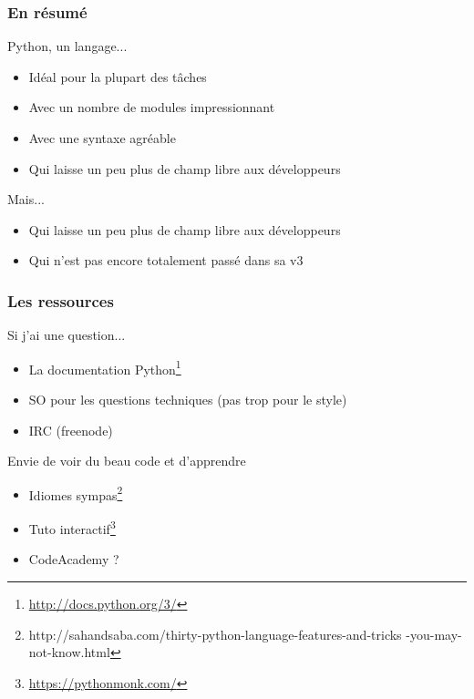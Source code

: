 \documentclass{beamer}
\begin{document}
\begin{frame}
  \frametitle{En résumé}

  \begin{block}{Python, un langage...}
    \begin{itemize}
    \item Idéal pour la plupart des tâches
    \item Avec un nombre de modules impressionnant
    \item Avec une syntaxe agréable
    \item Qui laisse un peu plus de champ libre aux développeurs
    \end{itemize}
  \end{block}

  \begin{block}{Mais...}
    \begin{itemize}
    \item Qui laisse un peu plus de champ libre aux développeurs
    \item Qui n'est pas encore totalement passé dans sa v3
    \end{itemize}
  \end{block}

\end{frame}

\begin{frame}
  \frametitle{Les ressources}

  \begin{block}{Si j'ai une question...}
    \begin{itemize}
    \item La documentation
      Python\footnote{\url{http://docs.python.org/3/}}
    \item SO pour les questions techniques (pas trop pour le style)
    \item IRC (freenode)
    \end{itemize}
  \end{block}

  \begin{block}{Envie de voir du beau code et d'apprendre}
    \begin{itemize}
    \item Idiomes sympas\footnote{http://sahandsaba.com/thirty-python-language-features-and-tricks -you-may-not-know.html}
    \item Tuto interactif\footnote{\url{https://pythonmonk.com/}}
    \item CodeAcademy ?
   \end{itemize}
  \end{block}
\end{frame}
\end{document}
